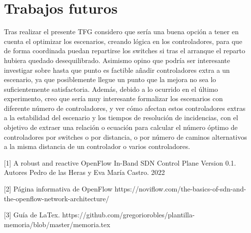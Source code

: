 \documentclass[a4paper, 12pt]{book}
\begin{document}
	
	\section{Trabajos futuros}
	\label{sec:trabajos_futuros}
	
	Tras realizar el presente TFG considero que sería una buena opción a tener en cuenta el optimizar los escenarios, creando lógica en los controladores, para que de forma coordinada puedan repartirse los switches si tras el arranque el reparto hubiera quedado desequilibrado. Asimismo opino que podría ser interesante investigar sobre hasta que punto es factible añadir controladores extra a un escenario, ya que posiblemente llegue un punto que la mejora no sea lo suficientemente satisfactoria. 
	Además, debido a lo ocurrido en el último experimento, creo que sería muy interesante formalizar los escenarios con diferente número de controladores, y ver cómo afectan estos controladores extras a la estabilidad del escenario y los tiempos de resolución de incidencias, con el objetivo de extraer una relación o ecuación para calcular el número óptimo de controladores por switches o por distancia, o por número de caminos alternativos a la misma distancia de un controlador o varios controladores.
	
	
	
	\cleardoublepage
	
	
	\cleardoublepage
	
	
	 
	
	[1]  A robust and reactive
	OpenFlow In-Band SDN Control Plane
	Version 0.1. Autores Pedro de las Heras y Eva María Castro. 2022
	
	[2]  Página informativa de OpenFlow https://noviflow.com/the-basics-of-sdn-and-the-openflow-network-architecture/ 
		
	[3]  Guía de LaTex.  https://github.com/gregoriorobles/plantilla-memoria/blob/master/memoria.tex
	
\end{document}
